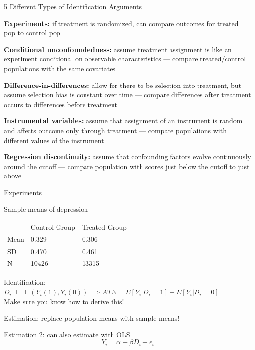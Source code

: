 \documentclass[11pt,english,handout]{beamer}
\newenvironment{wideitemize}{\itemize\addtolength{\itemsep}{10pt}}{\enditemize}
\newcommand{\indep}{\perp\!\!\!\!\perp}
\begin{document}
\begin{frame}{5 Different Types of Identification Arguments}
	\begin{wideitemize}
		\item
		\textbf{Experiments:} if treatment is randomized, can compare outcomes for treated pop to control pop
		
		\pause
		\item
		\textbf{Conditional unconfoundedness:} assume treatment assignment is like an experiment conditional on observable characteristics --- compare treated/control populations with the same covariates
		
		\pause
		\item
		\textbf{Difference-in-differences:} allow for there to be selection into treatment, but assume selection bias is constant over time --- compare differences after treatment occurs to differences before treatment
		
		\pause
		\item
		\textbf{Instrumental variables:} assume that assignment of an instrument is random and affects outcome only through treatment --- compare populations with different values of the instrument
		
		\pause
		\item
		\textbf{Regression discontinuity:} assume that confounding factors evolve continuously around the cutoff --- compare population with scores just below the cutoff to just above
	\end{wideitemize}	
\end{frame}

\begin{frame}{Experiments}

Sample means of depression
\begin{tabular}{lll}
	& Control Group & Treated Group \\
	Mean & 0.329 & 0.306\\
	SD & 0.470 &  0.461 \\
	N & 10426 & 13315  
\end{tabular}


\begin{wideitemize}
	\item
	Identification: \pause{}$D_i \indep (Y_i(1),Y_i(0))  \implies ATE = E[Y_i | D_i =1 ] - E[Y_i | D_i = 0]$ \\ \medskip Make sure you know how to derive this!
	
	\pause
	\item
	Estimation: replace population means with sample means!
	
	\pause
	\item
	Estimation 2: can also estimate with OLS
	$$Y_i = \alpha + \beta D_i + \epsilon_i$$
\end{wideitemize}
	
\end{frame}
\end{document}
